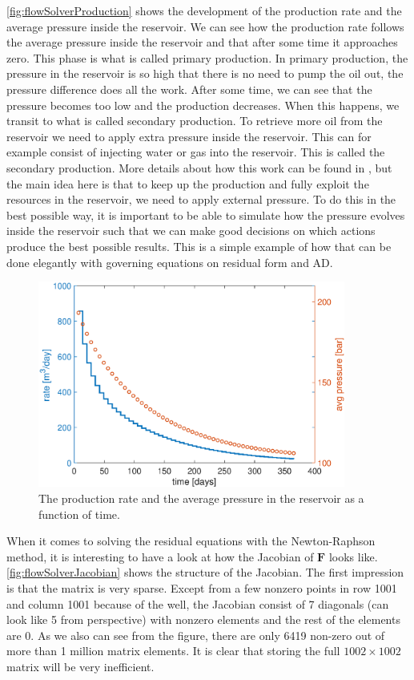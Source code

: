 \autoref{fig:flowSolverProduction} shows the development of the production rate and the average pressure inside the reservoir. We can see how the production rate follows the average pressure inside the reservoir and that after some time it approaches zero. This phase is what is called primary production. In primary production, the pressure in the reservoir is so high that there is no need to pump the oil out, the pressure difference does all the work. After some time, we can see that the pressure becomes too low and the production decreases. When this happens, we transit to what is called secondary production. To retrieve more oil from the reservoir we need to apply extra pressure inside the reservoir. This can for example consist of injecting water or gas into the reservoir. This is called the secondary production. More details about how this work can be found in \emph{\citep{lieMrstUrl}}, but the main idea here is that to keep up the production and fully exploit the resources in the reservoir, we need to apply external pressure. To do this in the best possible way, it is important to be able to simulate how the pressure evolves inside the reservoir such that we can make good decisions on which actions produce the best possible results. This is a simple example of how that can be done elegantly with governing equations on residual form and AD.
\begin{figure}[htbp]
    \centering
    \includegraphics[width = 0.9\textwidth]{figures/flow_solver_production.eps}
    \caption{The production rate and the average pressure in the reservoir as a function of time.}
    \label{fig:flowSolverProduction}
\end{figure}

When it comes to solving the residual equations with the Newton-Raphson method, it is interesting to have a look at how the Jacobian of $\boldsymbol{F}$ looks like. \autoref{fig:flowSolverJacobian} shows the structure of the Jacobian. The first impression is that the matrix is very sparse. Except from a few nonzero points in row 1001 and column 1001 because of the well, the Jacobian consist of 7 diagonals (can look like 5 from perspective) with nonzero elements and the rest of the elements are 0. As we also can see from the figure, there are only 6419 non-zero out of more than 1 million matrix elements. It is clear that storing the full $1002\times 1002$ matrix will be very inefficient.

